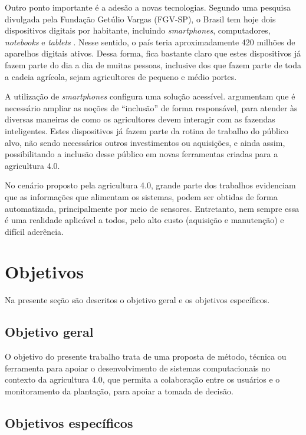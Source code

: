 \documentclass[12pt]{article}
\begin{document}
Outro ponto importante é a adesão a novas tecnologias. Segundo uma pesquisa divulgada pela Fundação Getúlio Vargas (FGV-SP), o Brasil tem hoje dois dispositivos digitais por habitante, incluindo \textit{smartphones}, computadores, \textit{notebooks} e \textit{tablets} \cite{FGV:2020}. Nesse sentido, o país teria aproximadamente 420 milhões de aparelhos digitais ativos. Dessa forma, fica bastante claro que estes dispositivos já fazem parte do dia a dia de muitas pessoas, inclusive dos que fazem parte de toda a cadeia agrícola, sejam agricultores de pequeno e médio portes.

A utilização de \textit{smartphones} configura uma solução acessível.  argumentam que é necessário ampliar as noções de ``inclusão'' de forma responsável, para atender às diversas maneiras de como os agricultores devem interagir com as fazendas inteligentes. Estes dispositivos já fazem parte da rotina de trabalho do público alvo, não sendo necessários outros investimentos ou aquisições, e ainda assim, possibilitando a inclusão desse público em novas ferramentas criadas para a agricultura 4.0.

No cenário proposto pela agricultura 4.0, grande parte dos trabalhos evidenciam que as informações que alimentam os sistemas, podem ser obtidas de forma automatizada, principalmente por meio de sensores. Entretanto, nem sempre essa é uma realidade aplicável a todos, pelo alto custo (aquisição e manutenção) e difícil aderência.

\section{Objetivos}
\label{sec:objetivos}

Na presente seção são descritos o objetivo geral e os objetivos específicos.

\subsection{Objetivo geral}
\label{subsec:objetivo_geral}

O objetivo do presente trabalho trata de uma proposta de método, técnica ou ferramenta para apoiar o desenvolvimento de sistemas computacionais no contexto da agricultura 4.0, que permita a colaboração entre os usuários e o monitoramento da plantação, para apoiar a tomada de decisão.

\subsection{Objetivos específicos}
\label{subsec:objetivos_especificos}
\end{document}
